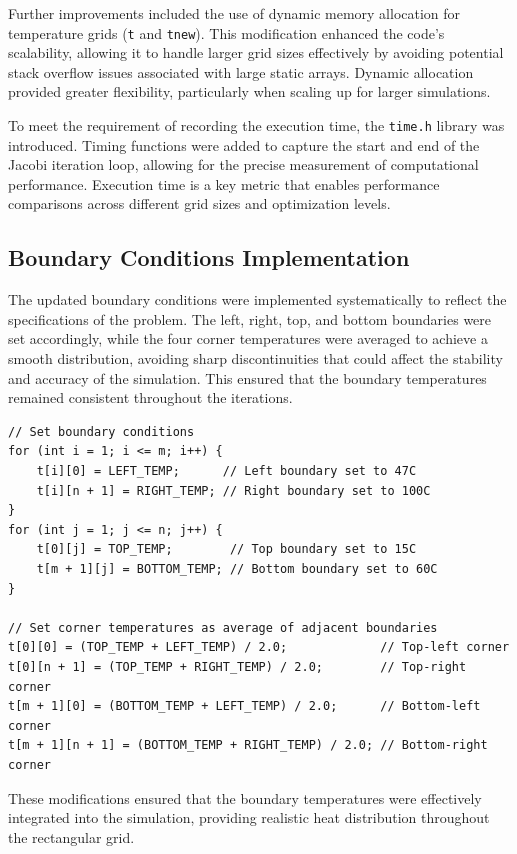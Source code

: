 \documentclass{article}
\begin{document}
Further improvements included the use of dynamic memory allocation for temperature grids (\texttt{t} and \texttt{tnew}). This modification enhanced the code's scalability, allowing it to handle larger grid sizes effectively by avoiding potential stack overflow issues associated with large static arrays. Dynamic allocation provided greater flexibility, particularly when scaling up for larger simulations.

To meet the requirement of recording the execution time, the \texttt{time.h} library was introduced. Timing functions were added to capture the start and end of the Jacobi iteration loop, allowing for the precise measurement of computational performance. Execution time is a key metric that enables performance comparisons across different grid sizes and optimization levels.

\subsection{Boundary Conditions Implementation}

The updated boundary conditions were implemented systematically to reflect the specifications of the problem. The left, right, top, and bottom boundaries were set accordingly, while the four corner temperatures were averaged to achieve a smooth distribution, avoiding sharp discontinuities that could affect the stability and accuracy of the simulation. This ensured that the boundary temperatures remained consistent throughout the iterations.

\begin{lstlisting}[style=CStyle, caption={Setting Boundary Conditions}]
// Set boundary conditions
for (int i = 1; i <= m; i++) {
    t[i][0] = LEFT_TEMP;      // Left boundary set to 47C
    t[i][n + 1] = RIGHT_TEMP; // Right boundary set to 100C
}
for (int j = 1; j <= n; j++) {
    t[0][j] = TOP_TEMP;        // Top boundary set to 15C
    t[m + 1][j] = BOTTOM_TEMP; // Bottom boundary set to 60C
}

// Set corner temperatures as average of adjacent boundaries
t[0][0] = (TOP_TEMP + LEFT_TEMP) / 2.0;             // Top-left corner
t[0][n + 1] = (TOP_TEMP + RIGHT_TEMP) / 2.0;        // Top-right corner
t[m + 1][0] = (BOTTOM_TEMP + LEFT_TEMP) / 2.0;      // Bottom-left corner
t[m + 1][n + 1] = (BOTTOM_TEMP + RIGHT_TEMP) / 2.0; // Bottom-right corner
\end{lstlisting}

These modifications ensured that the boundary temperatures were effectively integrated into the simulation, providing realistic heat distribution throughout the rectangular grid.
\end{document}
